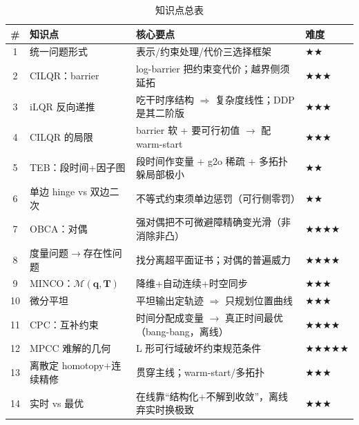 \begin{table}[H]\centering\small
\caption{知识点总表}
\label{tab:st-knowledge}
\begin{tabular}{clll}
\toprule
\# & 知识点 & 核心要点 & 难度 \\
\midrule
1 & 统一问题形式 & 表示/约束处理/代价三选择框架 & \(\bigstar\bigstar\) \\
2 & CILQR：barrier & log-barrier 把约束变代价；越界侧须延拓 & \(\bigstar\bigstar\bigstar\) \\
3 & iLQR 反向递推 & 吃干时序结构 $\Rightarrow$ 复杂度线性；DDP 是其二阶版 & \(\bigstar\bigstar\bigstar\) \\
4 & CILQR 的局限 & barrier 软 + 要可行初值 $\to$ 配 warm-start & \(\bigstar\bigstar\bigstar\) \\
5 & TEB：段时间+因子图 & 段时间作变量 + g2o 稀疏 + 多拓扑躲局部极小 & \(\bigstar\bigstar\) \\
6 & 单边 hinge vs 双边二次 & 不等式约束须单边惩罚（可行侧零罚） & \(\bigstar\bigstar\) \\
7 & OBCA：对偶 & 强对偶把不可微避障精确变光滑（非消除非凸） & \(\bigstar\bigstar\bigstar\bigstar\) \\
8 & 度量问题$\to$存在性问题 & 找分离超平面证书；对偶的普遍威力 & \(\bigstar\bigstar\bigstar\bigstar\) \\
9 & MINCO：$\mathcal M(\mathbf q,\mathbf T)$ & 降维+自动连续+时空同步 & \(\bigstar\bigstar\bigstar\) \\
10 & 微分平坦 & 平坦输出定轨迹 $\Rightarrow$ 只规划位置曲线 & \(\bigstar\bigstar\bigstar\) \\
11 & CPC：互补约束 & 时间分配成变量 $\to$ 真正时间最优（bang-bang，离线） & \(\bigstar\bigstar\bigstar\bigstar\) \\
12 & MPCC 难解的几何 & L 形可行域破坏约束规范条件 & \(\bigstar\bigstar\bigstar\bigstar\bigstar\) \\
13 & 离散定 homotopy+连续精修 & 贯穿主线；warm-start/多拓扑 & \(\bigstar\bigstar\bigstar\) \\
14 & 实时 vs 最优 & 在线靠“结构化+不解到收敛”，离线弃实时换极致 & \(\bigstar\bigstar\bigstar\) \\
\bottomrule
\end{tabular}
\end{table}

